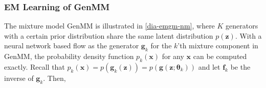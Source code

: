 \subsubsection{EM Learning of GenMM}
\label{sec-algo-genmm}
The mixture model GenMM is illustrated in \autoref{dia-emgm-nm},
where $K$ generators with a certain prior distribution share the same
latent distribution $p(\bm{z})$. With a neural network based flow as the generator $\bm{g}_k$ for the $k$'th mixture component in GenMM, the probability density function $p_k(\bm{x})$ for any
$\bm{x}$ can be computed exactly. Recall that $p_k(\bm{x}) =  p(\bm{g}_k(\bm{z})) =p(\bm{g}(\bm{z};\bm{\theta}_k))$ and let $\bm{f}_k$ be the inverse of $\bm{g}_k$. Then, %
